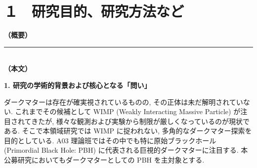 \documentclass[11pt,a4paper,uplatex,dvipdfmx]{ujarticle} 		%
\newcommand{\研究課題名}{曲率ゆらぎの統計と原始ブラックホール量の精密対応}
\newcommand{\研究機関名}{名古屋大学}
\newcommand{\研究代表者氏名}{多田祐一郎}
\newcommand{\研究期間の最終元号年度}{4}  %
\begin{document}
\mgfamily\sffamily


\section{１　研究目的、研究方法など}

\noindent
\textbf{（概要）}\\
	
	\vspace*{10zw}	%

\noindent
\rule{\linewidth}{1pt}\\
\noindent
\textbf{（本文）}

\begin{mdframed}[roundcorner=0.5zw,
	innertopmargin=0.8zw,innerbottommargin=0.8zw,
	linecolor=black!50,linewidth=0.2zw,
	backgroundcolor=black!10]
	{\bfseries\gtfamily\sffamily\large 1. 研究の学術的背景および核心となる「問い」}
\end{mdframed}

\noindent
ダークマターは存在が確実視されているものの, その正体は未だ解明されていない.
これまでその候補として WIMP (Weakly Interacting Massive Particle) が注目されてきたが, 様々な観測および実験から制限が厳しくなっているのが現状である.
そこで本領域研究では WIMP に捉われない, 多角的なダークマター探索を目的としている.
A03 理論班ではその中でも特に原始ブラックホール (Primordial Black Hole: PBH) に代表される巨視的ダークマターに注目する.
本公募研究においてもダークマターとしての PBH を主対象とする.
\end{document}
